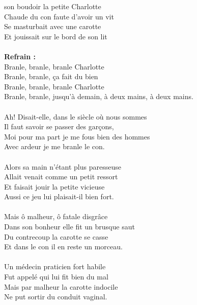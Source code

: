 \vspace{-0.3cm}
 son boudoir la petite Charlotte
\\Chaude du con faute d'avoir un vit
\\Se masturbait avec une carotte
\\Et jouissait sur le bord de son lit
\\\\\textbf{Refrain :}
\\Branle, branle, branle Charlotte
\\Branle, branle, ça fait du bien
\\Branle, branle, branle Charlotte
\\Branle, branle, jusqu'à demain, à deux mains, à deux mains.
\\\\Ah! Disait-elle, dans le siècle où nous sommes
\\Il faut savoir se passer des garçons,
\\Moi pour ma part je me fous bien des hommes
\\Avec ardeur je me branle le con.
\\\\Alors sa main n'étant plus paresseuse
\\Allait venait comme un petit ressort
\\Et faisait jouir la petite vicieuse
\\Aussi ce jeu lui plaisait-il bien fort.
\\\\Mais ô malheur, ô fatale disgrâce
\\Dans son bonheur elle fit un brusque saut
\\Du contrecoup la carotte se casse
\\Et dans le con il en reste un morceau.
\\\\Un médecin praticien fort habile
\\Fut appelé qui lui fit bien du mal
\\Mais par malheur la carotte indocile
\\Ne put sortir du conduit vaginal.

